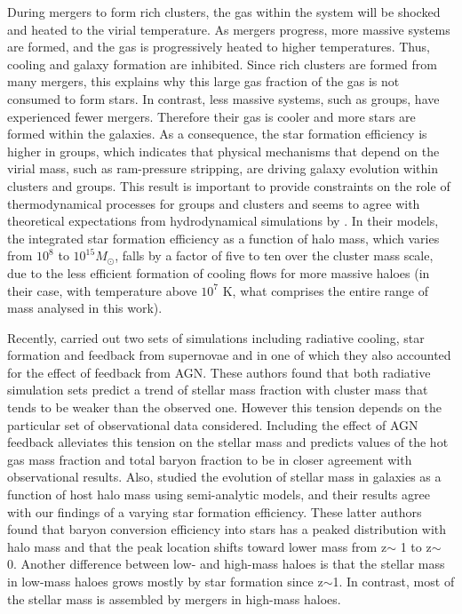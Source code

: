 \documentclass{aa}
\begin{document}
During mergers to form rich clusters, the gas within the
  system will be shocked and heated to the virial temperature.  As
  mergers progress, more massive systems are formed, and the gas is
  progressively heated to higher temperatures. Thus, cooling and
  galaxy formation are inhibited. Since rich clusters are formed from
  many mergers, this explains why this large gas fraction of the gas
  is not consumed to form stars.  In contrast, less massive
  systems, such as groups, have experienced fewer mergers. Therefore their
  gas is cooler and more stars are formed within the galaxies. As a
  consequence, the star formation efficiency is higher in groups, which
  indicates that physical mechanisms that depend on the virial mass, such
  as ram-pressure stripping,  are driving galaxy evolution within
  clusters and groups.  This result is important to provide
constraints on the role of thermodynamical processes for groups and
clusters and seems to agree with theoretical expectations
from hydrodynamical simulations by \citet{SH03}.
In their models, the integrated star formation efficiency as a function of halo mass, which varies from $10^{8}$ 
to $10^{15} M_{\odot}$, falls by a factor of five to ten over the cluster mass scale, due to
the less efficient formation of cooling flows for more massive haloes (in their case, with temperature above 
$10^{7}$ K, what comprises the entire range of mass analysed in this work).

Recently, \citet{planelles13}  carried out two sets of simulations including radiative cooling, 
star formation and feedback from supernovae and in one of which they also accounted for the effect of
feedback from AGN. These authors found that both radiative simulation sets
predict a trend of stellar mass fraction with cluster mass that tends to be weaker
than the observed one. However this tension depends on the particular set of
observational data considered. Including the effect of AGN feedback alleviates
this tension on the stellar mass and predicts values of the hot gas mass fraction
and total baryon fraction to be in closer agreement with observational results.
Also, \citet{zehavi12} studied the evolution of stellar mass in galaxies as a function of host halo mass using semi-analytic
 models, and their results agree with our findings of a varying star formation efficiency. These latter authors found that baryon 
 conversion efficiency into stars has a peaked distribution with halo mass and that the peak location shifts toward lower mass from 
 z$\sim$ 1 to z$\sim$ 0. Another difference between low- and high-mass haloes is that the stellar mass
 in low-mass haloes grows mostly by star formation since z$\sim$1. In contrast,  most of the stellar mass is assembled by mergers
 in high-mass haloes.
\end{document}
